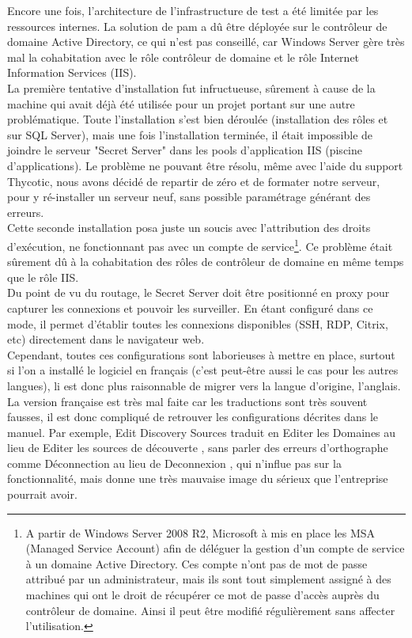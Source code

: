 Encore une fois, l'architecture de l'infrastructure de test a été limitée par les ressources internes. La solution de \gls{pam} a dû être déployée sur le contrôleur de domaine Active Directory, ce qui n'est pas conseillé, car Windows Server gère très mal la cohabitation avec le rôle contrôleur de domaine et le rôle Internet Information Services (IIS).\\
La première tentative d'installation fut infructueuse, sûrement à cause de la machine qui avait déjà été utilisée pour un projet portant sur une autre problématique. Toute l'installation s'est bien déroulée (installation des rôles et sur SQL Server), mais une fois l'installation terminée, il était impossible de joindre le serveur "Secret Server" dans les pools d'application IIS (piscine d'applications). Le problème ne pouvant être résolu, même avec l'aide du support Thycotic, nous avons décidé de repartir de zéro et de formater notre serveur, pour y ré-installer un serveur neuf, sans possible paramétrage générant des erreurs.\\
Cette seconde installation posa juste un soucis avec l'attribution des droits d'exécution, ne fonctionnant pas avec un compte de service\footnote{A partir de Windows Server 2008 R2, Microsoft à mis en place les MSA (Managed Service Account) afin de déléguer la gestion d'un compte de service à un domaine Active Directory. Ces compte n'ont pas de mot de passe attribué par un administrateur, mais ils sont tout simplement assigné à des machines qui ont le droit de récupérer ce mot de passe d'accès auprès du contrôleur de domaine. Ainsi il peut être modifié régulièrement sans affecter l'utilisation.}. Ce problème était sûrement dû à la cohabitation des rôles de contrôleur de domaine en même temps que le rôle IIS.\\
Du point de vu du routage, le Secret Server doit être positionné en proxy pour capturer les connexions et pouvoir les surveiller. En étant configuré dans ce mode, il permet d'établir toutes les connexions disponibles (SSH, RDP, Citrix, etc) directement dans le navigateur web.\\
Cependant, toutes ces configurations sont laborieuses à mettre en place, surtout si l'on a installé le logiciel en français (c'est peut-être aussi le cas pour les autres langues), li est donc plus raisonnable de migrer vers la langue d'origine, l'anglais. La version française est très mal faite car les traductions sont très souvent fausses, il est donc compliqué de retrouver les configurations décrites dans le manuel. Par exemple, \og Edit Discovery Sources \fg{} traduit en \og Editer les Domaines \fg{} au lieu de \og Editer les sources de découverte \fg{}, sans parler des erreurs d'orthographe comme \og Déconnection \fg{} au lieu de \og Deconnexion \fg{}, qui n'influe pas sur la fonctionnalité, mais donne une très mauvaise image du sérieux que l'entreprise pourrait avoir.

